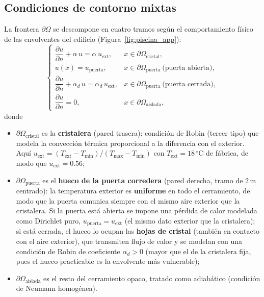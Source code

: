 \begin{itemize}
\subsection{Condiciones de contorno mixtas}

La frontera $\partial\Omega$ se descompone en cuatro tramos según el
comportamiento físico de las envolventes del edificio
(Figura~\ref{fig:piscina_app}):
\begin{equation}\label{eq:piscina_cc}
  \begin{cases}
    \dfrac{\partial u}{\partial n} + \alpha\, u = \alpha\, u_{\mathrm{ext}},
      & x \in \partial\Omega_{\mathrm{cristal}}, \\[8pt]
    u(x) = u_{\mathrm{puerta}},
      & x \in \partial\Omega_{\mathrm{puerta}} \ \text{(puerta abierta)}, \\[6pt]
    \dfrac{\partial u}{\partial n} + \alpha_d\, u = \alpha_d\, u_{\mathrm{ext}},
      & x \in \partial\Omega_{\mathrm{puerta}} \ \text{(puerta cerrada)}, \\[6pt]
    \dfrac{\partial u}{\partial n} = 0,
      & x \in \partial\Omega_{\mathrm{aislada}},
  \end{cases}
\end{equation}
donde
\begin{itemize}
  \item $\partial\Omega_{\mathrm{cristal}}$ es la \textbf{cristalera} (pared
  trasera): condición de Robin (tercer tipo) que modela la convección térmica
  proporcional a la diferencia con el exterior. Aquí
  $u_{\mathrm{ext}} = (T_{\mathrm{ext}} - T_{\min})/(T_{\max} - T_{\min})$
  con $T_{\mathrm{ext}} = 18\,^{\circ}\mathrm{C}$ de fábrica, de modo que
  $u_{\mathrm{ext}} = 0.56$;
  \item $\partial\Omega_{\mathrm{puerta}}$ es el \textbf{hueco de la puerta
  corredera} (pared derecha, tramo de 2\,m centrado): la temperatura exterior
  es \textbf{uniforme} en todo el cerramiento, de modo que la puerta comunica
  siempre con el mismo aire exterior que la cristalera. Si la puerta está
  abierta se impone una pérdida de calor modelada como Dirichlet puro,
  $u_{\mathrm{puerta}} = u_{\mathrm{ext}}$ (el mismo dato exterior que la
  cristalera); si está cerrada, el hueco lo ocupan las \textbf{hojas de
  cristal} (también en contacto con el aire exterior), que transmiten flujo de
  calor y se modelan con una condición de Robin de coeficiente
  $\alpha_d > 0$ (mayor que el de la cristalera fija, pues el hueco practicable
  es la envolvente más vulnerable);
  \item $\partial\Omega_{\mathrm{aislada}}$ es el resto del cerramiento opaco,
  tratado como adiabático (condición de Neumann homogénea).
\end{itemize}


\end{itemize}
